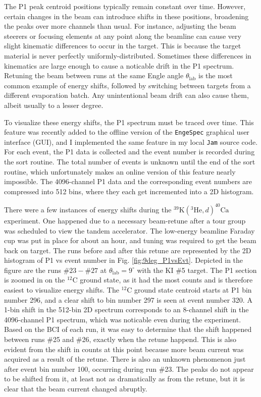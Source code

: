 
The P1 peak centroid positions typically remain constant over time. However, certain changes in the beam can introduce shifts in these positions, broadening the peaks over more channels than usual. For instance, adjusting the beam steerers or focusing elements at any point along the beamline can cause very slight kinematic differences to occur in the target. This is because the target material is never perfectly uniformly-distributed. Sometimes these differences in kinematics are large enough to cause a noticable drift in the P1 spectrum. Retuning the beam between runs at the same Engle angle $\theta_{\mathrm{lab}}$ is the most common example of energy shifts, followed by switching between targets from a different evaporation batch. Any unintentional beam drift can also cause them, albeit usually to a lesser degree.

To visualize these energy shifts, the P1 spectrum must be traced over time. This feature was recently added to the offline version of the \texttt{EngeSpec} \cite{EngeSpec} graphical user interface (GUI), and I implemented the same feature in my local \texttt{Jam} source code. For each event, the P1 data is collected and the event number is recorded during the sort routine. The total number of events is unknown until the end of the sort routine, which unfortunately makes an online version of this feature nearly impossible. The 4096-channel P1 data and the corresponding event numbers are compressed into 512 bins, where they each get incremented into a 2D histogram.

There were a few instances of energy shifts during the $^{39}\mathrm{K}(^{3}\mathrm{He},d)^{40}\mathrm{Ca}$ experiment. One happened due to a necessary beam-retune after a tour group was scheduled to view the tandem accelerator. The low-energy beamline Faraday cup was put in place for about an hour, and tuning was required to get the beam back on target. The runs before and after this retune are represented by the 2D histogram of P1 vs event number in Fig. \ref{fig:9deg_P1vsEvt}. Depicted in the figure are the runs $\#23-\#27$ at $\theta_{\mathrm{lab}} = 9^{\circ}$ with the KI $\#$5 target. The P1 section is zoomed in on the $^{12}$C ground state, as it had the most counts and is therefore easiest to visualize energy shifts. The $^{12}$C ground state centroid starts at P1 bin number 296, and a clear shift to bin number 297 is seen at event number 320. A 1-bin shift in the 512-bin 2D spectrum corresponds to an 8-channel shift in the 4096-channel P1 spectrum, which was noticable even during the experiment. Based on the BCI of each run, it was easy to determine that the shift happened between runs $\#$25 and $\#$26, exactly when the retune happend. This is also evident from the shift in counts at this point because more beam current was acquired as a result of the retune. There is also an unknown phenomenon just after event bin number 100, occurring during run $\#$23. The peaks do not appear to be shifted from it, at least not as dramatically as from the retune, but it is clear that the beam current changed abruptly.

